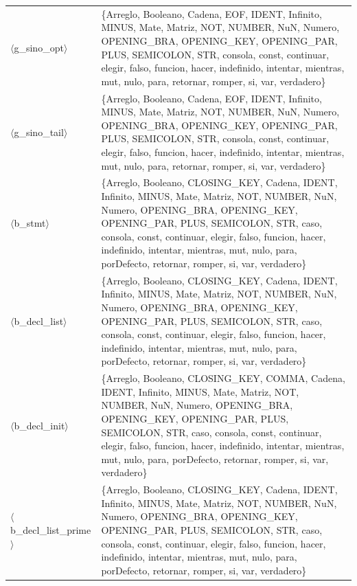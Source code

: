 \documentclass[10pt]{article}
\begin{document}
{\begin{longtable}{@{} p{3.5cm} p{13cm} @{}}
  \parbox[t]{3.3cm}{\raggedright$\langle$g\_\allowbreak{}sino\_\allowbreak{}opt$\rangle$} & \{Arreglo, Booleano, Cadena, EOF, IDENT, Infinito, MINUS, Mate, Matriz, NOT, NUMBER, NuN, Numero, OPENING\_BRA, OPENING\_KEY, OPENING\_PAR, PLUS, SEMICOLON, STR, consola, const, continuar, elegir, falso, funcion, hacer, indefinido, intentar, mientras, mut, nulo, para, retornar, romper, si, var, verdadero\} \\
  \parbox[t]{3.3cm}{\raggedright$\langle$g\_\allowbreak{}sino\_\allowbreak{}tail$\rangle$} & \{Arreglo, Booleano, Cadena, EOF, IDENT, Infinito, MINUS, Mate, Matriz, NOT, NUMBER, NuN, Numero, OPENING\_BRA, OPENING\_KEY, OPENING\_PAR, PLUS, SEMICOLON, STR, consola, const, continuar, elegir, falso, funcion, hacer, indefinido, intentar, mientras, mut, nulo, para, retornar, romper, si, var, verdadero\} \\
  \parbox[t]{3.3cm}{\raggedright$\langle$b\_\allowbreak{}stmt$\rangle$} & \{Arreglo, Booleano, CLOSING\_KEY, Cadena, IDENT, Infinito, MINUS, Mate, Matriz, NOT, NUMBER, NuN, Numero, OPENING\_BRA, OPENING\_KEY, OPENING\_PAR, PLUS, SEMICOLON, STR, caso, consola, const, continuar, elegir, falso, funcion, hacer, indefinido, intentar, mientras, mut, nulo, para, porDefecto, retornar, romper, si, var, verdadero\} \\
  \parbox[t]{3.3cm}{\raggedright$\langle$b\_\allowbreak{}decl\_\allowbreak{}list$\rangle$} & \{Arreglo, Booleano, CLOSING\_KEY, Cadena, IDENT, Infinito, MINUS, Mate, Matriz, NOT, NUMBER, NuN, Numero, OPENING\_BRA, OPENING\_KEY, OPENING\_PAR, PLUS, SEMICOLON, STR, caso, consola, const, continuar, elegir, falso, funcion, hacer, indefinido, intentar, mientras, mut, nulo, para, porDefecto, retornar, romper, si, var, verdadero\} \\
  \parbox[t]{3.3cm}{\raggedright$\langle$b\_\allowbreak{}decl\_\allowbreak{}init$\rangle$} & \{Arreglo, Booleano, CLOSING\_KEY, COMMA, Cadena, IDENT, Infinito, MINUS, Mate, Matriz, NOT, NUMBER, NuN, Numero, OPENING\_BRA, OPENING\_KEY, OPENING\_PAR, PLUS, SEMICOLON, STR, caso, consola, const, continuar, elegir, falso, funcion, hacer, indefinido, intentar, mientras, mut, nulo, para, porDefecto, retornar, romper, si, var, verdadero\} \\
  \parbox[t]{3.3cm}{\raggedright$\langle$b\_\allowbreak{}decl\_\allowbreak{}list\_\allowbreak{}prime$\rangle$} & \{Arreglo, Booleano, CLOSING\_KEY, Cadena, IDENT, Infinito, MINUS, Mate, Matriz, NOT, NUMBER, NuN, Numero, OPENING\_BRA, OPENING\_KEY, OPENING\_PAR, PLUS, SEMICOLON, STR, caso, consola, const, continuar, elegir, falso, funcion, hacer, indefinido, intentar, mientras, mut, nulo, para, porDefecto, retornar, romper, si, var, verdadero\} \\

\end{longtable}}
\end{document}
